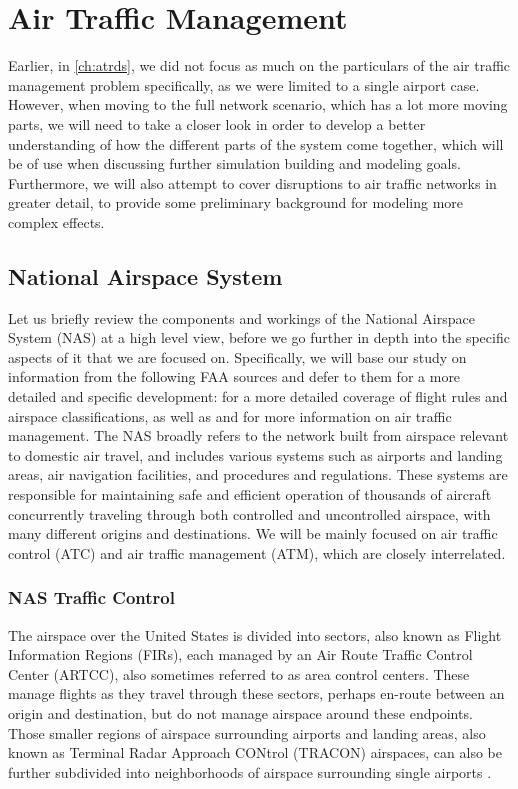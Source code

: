\chapter{Air Traffic Management}
\label{app:atm}

Earlier, in \cref{ch:atrds}, we did not focus as much on the particulars of the air traffic management problem specifically, as we were limited to a single airport case. However, when moving to the full network scenario, which has a lot more moving parts, we will need to take a closer look in order to develop a better understanding of how the different parts of the system come together, which will be of use when discussing further simulation building and modeling goals. Furthermore, we will also attempt to cover disruptions to air traffic networks in greater detail, to provide some preliminary background for modeling more complex effects. 

\section{National Airspace System}
\label{sec:atm-nas}

Let us briefly review the components and workings of the National Airspace System (NAS) at a high level view, before we go further in depth into the specific aspects of it that we are focused on. Specifically, we will base our study on information from the following FAA sources and defer to them for a more detailed and specific development: \cite{faa_nas_2023} for a more detailed coverage of flight rules and airspace classifications, as well as \cite{faa_tmi_2024} and \cite{faa_tfm_prez_2009} for more information on air traffic management. The NAS broadly refers to the network built from airspace relevant to domestic air travel, and includes various systems such as airports and landing areas, air navigation facilities, and procedures and regulations. These systems are responsible for maintaining safe and efficient operation of thousands of aircraft concurrently traveling through both controlled and uncontrolled airspace, with many different origins and destinations. We will be mainly focused on air traffic control (ATC) and air traffic management (ATM), which are closely interrelated.

\subsection{NAS Traffic Control}

The airspace over the United States is divided into sectors, also known as Flight Information Regions (FIRs), each managed by an Air Route Traffic Control Center (ARTCC), also sometimes referred to as area control centers. These manage flights as they travel through these sectors, perhaps en-route between an origin and destination, but do not manage airspace around these endpoints. Those smaller regions of airspace surrounding airports and landing areas, also known as Terminal Radar Approach CONtrol (TRACON) airspaces, can also be further subdivided into neighborhoods of airspace surrounding single airports \cite{faa_tfm_overview_2025}.

